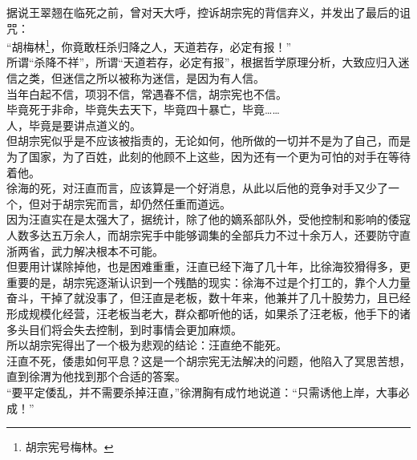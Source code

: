 \begin{multicols}{\theparacolNo}
据说王翠翘在临死之前，曾对天大呼，控诉胡宗宪的背信弃义，并发出了最后的诅咒：\\

“胡梅林\footnote{胡宗宪号梅林。}，你竟敢枉杀归降之人，天道若存，必定有报！”\\

所谓“杀降不祥”，所谓“天道若存，必定有报”，根据哲学原理分析，大致应归入迷信之类，但迷信之所以被称为迷信，是因为有人信。\\

当年白起不信，项羽不信，常遇春不信，胡宗宪也不信。\\

毕竟死于非命，毕竟失去天下，毕竟四十暴亡，毕竟……\\

人，毕竟是要讲点道义的。\\

但胡宗宪似乎是不应该被指责的，无论如何，他所做的一切并不是为了自己，而是为了国家，为了百姓，此刻的他顾不上这些，因为还有一个更为可怕的对手在等待着他。\\

徐海的死，对汪直而言，应该算是一个好消息，从此以后他的竞争对手又少了一个，但对于胡宗宪而言，却仍然任重而道远。\\

因为汪直实在是太强大了，据统计，除了他的嫡系部队外，受他控制和影响的倭寇人数多达五万余人，而胡宗宪手中能够调集的全部兵力不过十余万人，还要防守直浙两省，武力解决根本不可能。\\

但要用计谋除掉他，也是困难重重，汪直已经下海了几十年，比徐海狡猾得多，更重要的是，胡宗宪逐渐认识到一个残酷的现实：徐海不过是个打工的，靠个人力量奋斗，干掉了就没事了，但汪直是老板，数十年来，他兼并了几十股势力，且已经形成规模化经营，汪老板当老大，群众都听他的话，如果杀了汪老板，他手下的诸多头目们将会失去控制，到时事情会更加麻烦。\\

所以胡宗宪得出了一个极为悲观的结论：汪直绝不能死。\\

汪直不死，倭患如何平息？这是一个胡宗宪无法解决的问题，他陷入了冥思苦想，直到徐渭为他找到那个合适的答案。\\

“要平定倭乱，并不需要杀掉汪直，”徐渭胸有成竹地说道：“只需诱他上岸，大事必成！”\\
\ifnum{}
	\end{multicols}
\fi
\newpage
